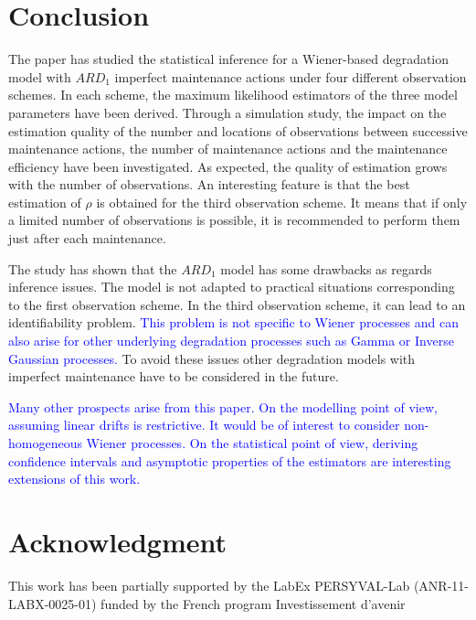\section{Conclusion}
\label{section:conc}

The paper has studied the statistical inference for a Wiener-based degradation model with $ARD_1$ imperfect maintenance actions under four different observation schemes. In each scheme, the maximum likelihood estimators of the three model parameters have been derived. Through a simulation study, the impact on the  estimation quality of the number and locations of observations between successive maintenance actions, the number of maintenance actions and the maintenance efficiency have been investigated. As expected, the quality of estimation grows with the number of observations. An interesting feature is that the best estimation of $\rho$ is obtained for the third observation scheme. It means that if only a limited number of observations is possible, it is recommended to perform them just after each maintenance.

The study has shown that the $ARD_1$ model has some drawbacks as regards inference issues. The model is not adapted to practical situations corresponding to the first observation scheme. In the third observation scheme, it can lead to an identifiability problem. \textcolor{blue}{This problem is not specific to Wiener processes and can also arise for other underlying degradation processes such as Gamma or Inverse Gaussian processes. } To avoid these issues other degradation models with imperfect maintenance have to be considered in the future. 

\textcolor{blue}{Many other prospects arise from this paper. On the modelling point of view, assuming linear drifts is restrictive. It would be of interest to consider non-homogeneous Wiener processes. On the statistical point of view, deriving confidence intervals and asymptotic properties of the estimators are interesting extensions of this work.}
\section*{Acknowledgment }
This work has been partially supported by the LabEx PERSYVAL-Lab (ANR-11-LABX-0025-01) funded by the French program Investissement d’avenir

